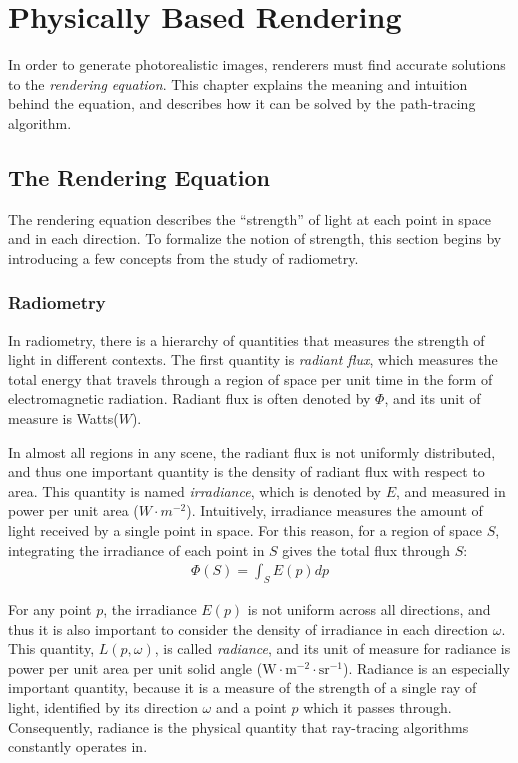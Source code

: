 \chapter{Physically Based Rendering}

In order to generate photorealistic images, renderers must find accurate solutions to the \textit{rendering equation}. This chapter explains the meaning and intuition behind the equation, and describes how it can be solved by the path-tracing algorithm.

\section{The Rendering Equation}

The rendering equation describes the ``strength'' of light at each point in space and in each direction. To formalize the notion of strength, this section begins by introducing a few concepts from the study of radiometry.

\subsection{Radiometry}

In radiometry, there is a hierarchy of quantities that measures the strength of light in different contexts. The first quantity is \textit{radiant flux}, which measures the total energy that travels through a region of space per unit time in the form of electromagnetic radiation. Radiant flux is often denoted by $\Phi$, and its unit of measure is Watts($W$). 

In almost all regions in any scene, the radiant flux is not uniformly distributed, and thus one important quantity is the density of radiant flux with respect to area. This quantity is named \textit{irradiance}, which is denoted by $E$, and measured in power per unit area ($W\cdot m^{-2}$). Intuitively, irradiance measures the amount of light received by a single point in space. For this reason, for a region of space $S$, integrating the irradiance of each point in $S$ gives the total flux through $S$:
\begin{align}
    \Phi(S) = \int_S E(p) dp 
    \label{irradiance integral}
\end{align}

For any point $p$, the irradiance $E(p)$ is not uniform across all directions, and thus it is also important to consider the density of irradiance in each direction $\omega$. This quantity, $L(p,\omega)$, is called \textit{radiance}, and its unit of measure for radiance is power per unit area per unit solid angle ($\text{W}\cdot\text{m}^{-2}\cdot \text{sr}^{-1}$). Radiance is an especially important quantity, because it is a measure of the strength of a single ray of light, identified by its direction $\omega$ and a point $p$ which it passes through. Consequently, radiance is the physical quantity that ray-tracing algorithms constantly operates in. 


